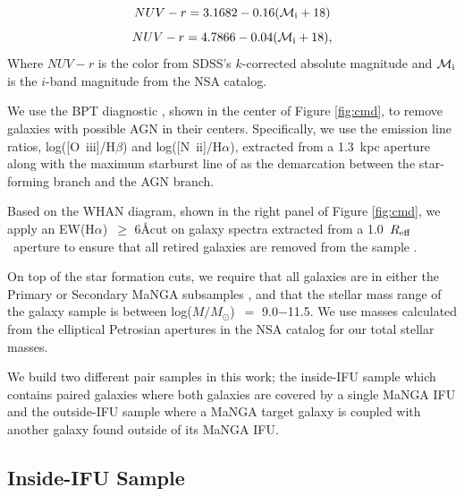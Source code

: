 \documentclass[apj,twocolumn]{emulateapj}
\newcommand{\reff}{$R_{\rm eff}$}
\newcommand{\ewha}{EW(H$\alpha$)}
\newcommand{\logm}{log($M/M_{\odot}$)}
\begin{document}
\begin{CJK*}{UTF8}{gbsn}
\begin{equation}\label{eq:blue}
NUV-r = 3.1682 - 0.16 (\mathcal{M}_{\rm i}+18)
\end{equation}
\begin{equation}\label{eq:red}
NUV-r = 4.7866 - 0.04 (\mathcal{M}_{\rm i}+18),
\end{equation}
Where $NUV-r$ is the color from SDSS's $k$-corrected absolute magnitude and $\mathcal{M}_{\rm i}$ is the $i$-band magnitude from the NSA catalog. 

We use the BPT diagnostic \citep{Baldwin:1981}, shown in the center of Figure \ref{fig:cmd}, to remove galaxies with possible AGN in their centers. Specifically, we use the emission line ratios, log([O~{\sc iii}]/H$\beta$) and log([N~{\sc ii}]/H$\alpha$), extracted from a 1.3~kpc aperture along with the maximum starburst line of \citet{Kewley:2001} as the demarcation between the star-forming branch and the AGN branch.

Based on the WHAN diagram, shown in the right panel of Figure \ref{fig:cmd}, we apply an \ewha\ $\ge$ 6\AA cut on galaxy spectra extracted from a 1.0~\reff\ aperture to ensure that all retired galaxies are removed from the sample \citep{Cid-Fernandes:2011}.

On top of the star formation cuts, we require that all galaxies are in either the Primary or Secondary MaNGA subsamples \citep{Wake:2017}, and that the stellar mass range of the galaxy sample is between \logm\ $=$ 9.0$-$11.5. We use masses calculated from the elliptical Petrosian apertures in the NSA catalog for our total stellar masses. 

We build two different pair samples in this work; the inside-IFU sample which contains paired galaxies where both galaxies are covered by a single MaNGA IFU and the outside-IFU sample where a MaNGA target galaxy is coupled with another galaxy found outside of its MaNGA IFU. 

\subsection{Inside-IFU Sample}\label{sec:inside}


\end{CJK*}
\end{document}
